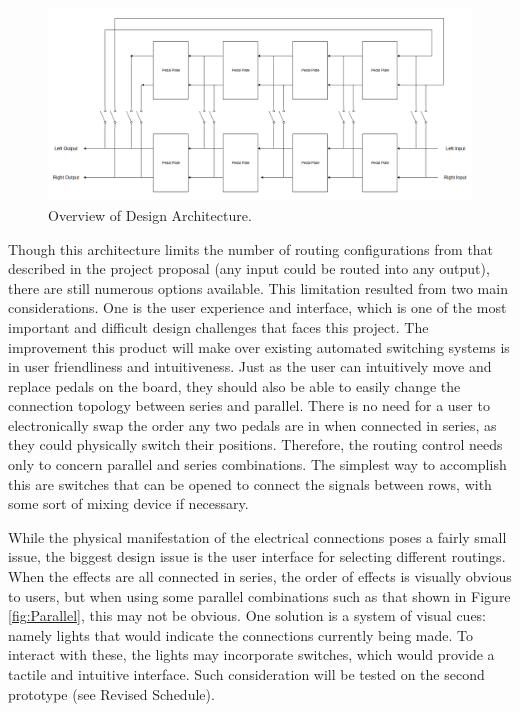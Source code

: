 \documentclass{article}
\begin{document}
	\begin{figure}
		\centering
		\includegraphics[width = \textwidth]{ES100PR1_OverviewScheme.png}
		\caption{Overview of Design Architecture.}
		\label{fig:OverviewScheme}
	\end{figure}

	Though this architecture limits the number of routing configurations from that described in the project proposal (any input could be routed into any output), there are still numerous options available.  This limitation resulted from two main considerations.  One is the user experience and interface, which is one of the most important and difficult design challenges that faces this project.  The improvement this product will make over existing automated switching systems is in user friendliness and intuitiveness.  Just as the user can intuitively move and replace pedals on the board, they should also be able to easily change the connection topology between series and parallel.  There is no need for a user to electronically swap the order any two pedals are in when connected in series, as they could physically switch their positions.  Therefore, the routing control needs only to concern parallel and series combinations.  The simplest way to accomplish this are switches that can be opened to connect the signals between rows, with some sort of mixing device if necessary.

	While the physical manifestation of the electrical connections poses a fairly small issue, the biggest design issue is the user interface for selecting different routings.  When the effects are all connected in series, the order of effects is visually obvious to users, but when using some parallel combinations such as that shown in Figure \ref{fig:Parallel}, this may not be obvious.  One solution is a system of visual cues: namely lights that would indicate the connections currently being made.  To interact with these, the lights may incorporate switches, which would provide a tactile and intuitive interface.  Such consideration will be tested on the second prototype (see Revised Schedule).
\end{document}
